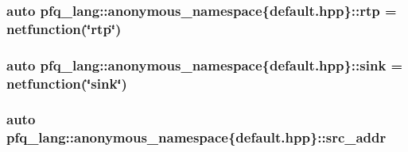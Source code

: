 \hypertarget{namespacepfq__lang_1_1anonymous__namespace_02default_8hpp_03_a13ac072f4d7f860256ef22d7f5a1a9ac}{
\subsubsection[{rtp}]{\setlength{\rightskip}{0pt plus 5cm}auto pfq\+\_\+lang\+::anonymous\+\_\+namespace\{default.\+hpp\}\+::rtp = {\bf netfunction}(\char`\"{}rtp\char`\"{})}}\label{namespacepfq__lang_1_1anonymous__namespace_02default_8hpp_03_a13ac072f4d7f860256ef22d7f5a1a9ac}
\hypertarget{namespacepfq__lang_1_1anonymous__namespace_02default_8hpp_03_ad708862e729d0cc6a217d86bb25b1061}{
\subsubsection[{sink}]{\setlength{\rightskip}{0pt plus 5cm}auto pfq\+\_\+lang\+::anonymous\+\_\+namespace\{default.\+hpp\}\+::sink = {\bf netfunction}(\char`\"{}sink\char`\"{})}}\label{namespacepfq__lang_1_1anonymous__namespace_02default_8hpp_03_ad708862e729d0cc6a217d86bb25b1061}
\hypertarget{namespacepfq__lang_1_1anonymous__namespace_02default_8hpp_03_a63c87ff605d7cefa807fd61bc463785d}{
\subsubsection[{src\+\_\+addr}]{\setlength{\rightskip}{0pt plus 5cm}auto pfq\+\_\+lang\+::anonymous\+\_\+namespace\{default.\+hpp\}\+::src\+\_\+addr}}\label{namespacepfq__lang_1_1anonymous__namespace_02default_8hpp_03_a63c87ff605d7cefa807fd61bc463785d}
